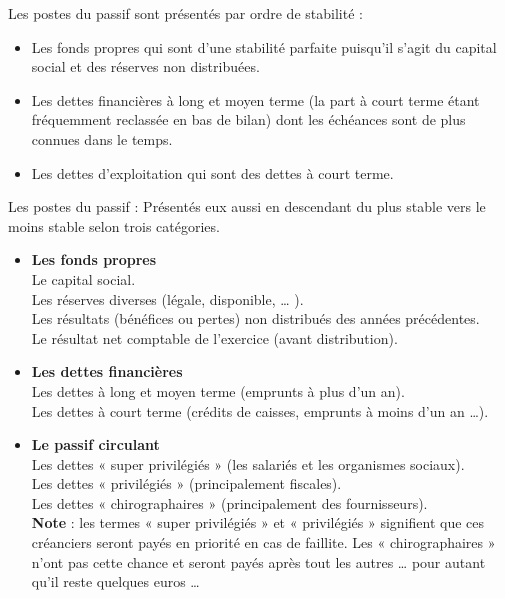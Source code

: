 \documentclass[a4paper,10pt]{article}
\begin{document}
\par Les postes du passif sont présentés par ordre de stabilité : \\
\begin{itemize}
\item Les fonds propres qui sont d’une stabilité parfaite puisqu’il s’agit du capital social et des réserves non distribuées. 
\item Les dettes financières à long et moyen terme (la part à court terme étant fréquemment reclassée en bas de bilan) dont les échéances sont de plus connues dans le temps. 
 \item Les dettes d’exploitation qui sont des dettes à court terme. 
\end{itemize}
\par 
Les postes du passif : Présentés eux aussi en descendant du plus stable vers le moins stable selon trois catégories.
\begin{itemize}
\item \textbf{Les fonds propres }\\
     Le capital social.\\
     Les réserves diverses (légale, disponible, … ).\\
     Les résultats (bénéfices ou pertes) non distribués des années précédentes.\\
     Le résultat net comptable de l’exercice (avant distribution). \\
\item \textbf{Les dettes financières}\\
	 Les dettes à long et moyen terme (emprunts à plus d’un an). \\
     Les dettes à court terme (crédits de caisses, emprunts à moins d’un an …).\\
\item \textbf{Le passif circulant}\\
 Les dettes « super privilégiés » (les salariés et les organismes sociaux).\\
    Les dettes « privilégiés » (principalement fiscales). \\
    Les dettes « chirographaires » (principalement des fournisseurs). \\
\textbf{Note} : les termes « super privilégiés » et « privilégiés » signifient que ces créanciers seront payés en priorité en cas de faillite. Les « chirographaires » n’ont pas cette chance et seront payés après tout les autres … pour autant qu’il reste quelques euros …\\
\end{itemize}
\end{document}
